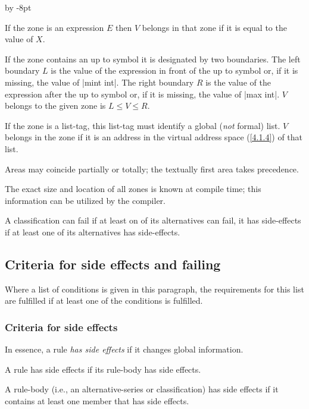 \documentclass{article}
\newcommand\g[1]{{\sf #1}}
\renewenvironment{itemize}{\begin{list}{}{%
\advance\leftmargin by -8pt%
\setlength\itemsep{0ex plus 0.2ex}%
\setlength\partopsep{3pt}%
\setlength\topsep{2pt plus 2pt}%
\setlength\parsep{0pt plus 2pt}%
}}{\end{list}}
\let\oref\ref
\let\ref\oref
\begin{document}
\begin{itemize}\item[$\cdot$]
If the \g{zone} is an \g{expression} $E$ then $V$ belongs in that \g{zone} if
it is equal to the value of $X$.
\item[$\cdot$]
If the \g{zone} contains an \g{up to symbol} it is designated by two
boundaries. The left boundary $L$ is the value of the \g{expression} in
front of the \g{up to symbol} or, if it is missing, the value of \pp|mint
int|. The right boundary $R$ is the value of the \g{expression} after the
\g{up to symbol} or, if it is missing, the value of \pp|max int|. $V$
belongs to the given \g{zone} is $L\le V\le R$.
\item[$\cdot$]
If the \g{zone} is a \g{list-tag}, this \g{list-tag} must identify a global
(\emph{not} formal) list. $V$ belongs in the \g{zone} if it is an
address in the virtual address space (\ref{4.1.4}) of that list.
\end{itemize}
\g{Area}s may coincide partially or totally; the textually first \g{area}
takes precedence.

The exact size and location of all \g{zone}s is known at compile time; this
information can be utilized by the compiler.

A \g{classification} can fail if at least on of its \g{alternative}s can
fail, it has side-effects if at least one of its \g{alternative}s has
side-effects.

\subsection{Criteria for side effects and failing}\label{3.9}

Where a list of conditions is given in this paragraph, the requirements for
this list are fulfilled if at least one of the conditions is fulfilled.

\subsubsection{Criteria for side effects}\label{3.9.1}
In essence, a rule \emph{has side effects} if it changes global
information.

A rule has side effects if its \g{rule-body} has side effects.

A \g{rule-body} (i.e., an \g{alternative-series} or \g{classification}) has
side effects if it contains at least one \g{member} that has side effects.
\end{document}
